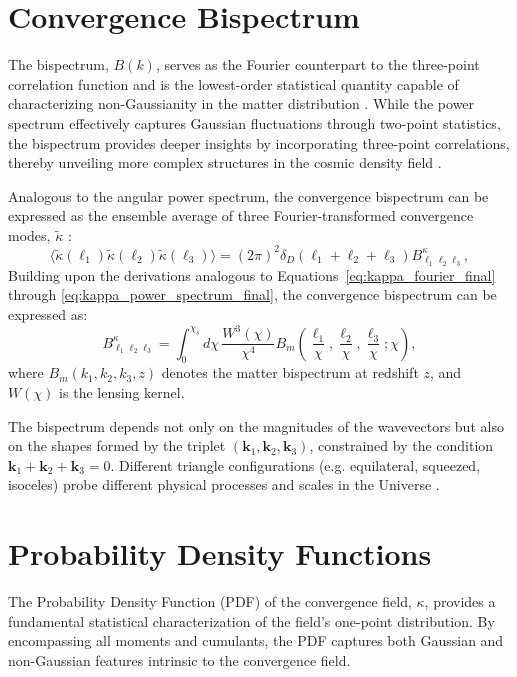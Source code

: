 \section{Convergence Bispectrum}
The bispectrum, \( B(k) \), serves as the Fourier counterpart to the three-point correlation function and is the lowest-order statistical quantity capable of characterizing non-Gaussianity in the matter distribution \citep{2002PhR...367....1B}. While the power spectrum effectively captures Gaussian fluctuations through two-point statistics, the bispectrum provides deeper insights by incorporating three-point correlations, thereby unveiling more complex structures in the cosmic density field \citep{1999ApJ...517..531S, 2004MNRAS.348..897T}.

Analogous to the angular power spectrum, the convergence bispectrum can be expressed as the ensemble average of three Fourier-transformed convergence modes, \( \tilde{\kappa} \) \citep{2005PhRvD..72h3001D}:
\begin{equation}
    \langle \tilde{\kappa}(\mathbf{\ell}_1) \tilde{\kappa}(\mathbf{\ell}_2) \tilde{\kappa}(\mathbf{\ell}_3) \rangle = (2\pi)^2 \delta_{D}(\mathbf{\ell}_1 + \mathbf{\ell}_2 + \mathbf{\ell}_3) B^\kappa_{\ell_1 \ell_2 \ell_3},
    \label{eq:convergence_bispectrum_def}
\end{equation}
Building upon the derivations analogous to Equations~\eqref{eq:kappa_fourier_final} through \eqref{eq:kappa_power_spectrum_final}, the convergence bispectrum can be expressed as:
\begin{equation}
    B_{\ell_1 \ell_2 \ell_3}^\kappa = \int_0^{\chi_s} d\chi \, \frac{W^3(\chi)}{\chi^4} B_m\left( \frac{\ell_1}{\chi}, \frac{\ell_2}{\chi}, \frac{\ell_3}{\chi}; \chi \right),
    \label{eq:convergence_bispectrum}
\end{equation}
where \( B_m(k_1, k_2, k_3, z) \) denotes the matter bispectrum at redshift \( z \), and \( W(\chi) \) is the lensing kernel. 

The bispectrum depends not only on the magnitudes of the wavevectors but also on the shapes formed by the triplet \( (\boldsymbol{k}_1, \boldsymbol{k}_2, \boldsymbol{k}_3) \), constrained by the condition \( \boldsymbol{k}_1 + \boldsymbol{k}_2 + \boldsymbol{k}_3 = 0 \). Different triangle configurations (e.g. equilateral, squeezed, isoceles) probe different physical processes and scales in the Universe \citep{2005PhRvD..72h3001D}.

\section{Probability Density Functions} \label{sec:pdfs}
The Probability Density Function (PDF) of the convergence field, $\kappa$, provides a fundamental statistical characterization of the field's one-point distribution. By encompassing all moments and cumulants, the PDF captures both Gaussian and non-Gaussian features intrinsic to the convergence field.

